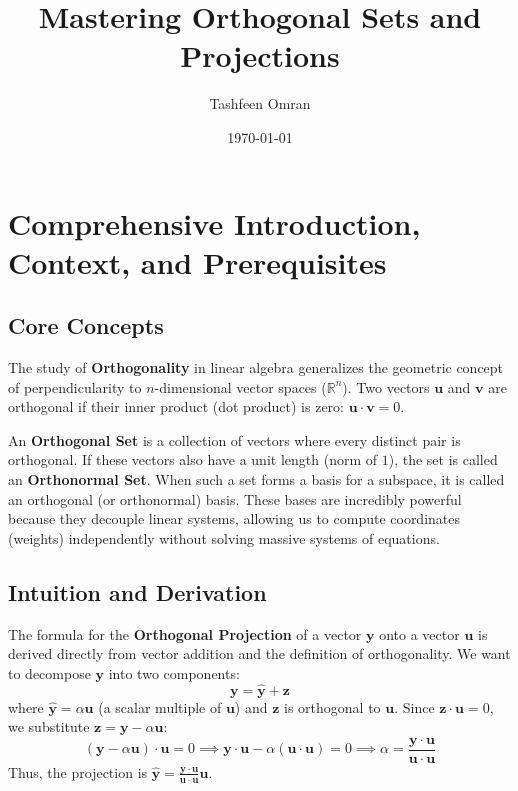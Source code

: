 \documentclass[11pt, letterpaper]{article}
\title{\textbf{Mastering Orthogonal Sets and Projections}}
\author{Tashfeen Omran}
\date{\today}
\theoremstyle{definition}
\theoremstyle{remark}
\newcommand{\R}{\mathbb{R}}
\begin{document}
\maketitle
\tableofcontents
\newpage

\section{Comprehensive Introduction, Context, and Prerequisites}

\subsection{Core Concepts}
The study of \textbf{Orthogonality} in linear algebra generalizes the geometric concept of perpendicularity to $n$-dimensional vector spaces ($\R^n$). Two vectors $\mathbf{u}$ and $\mathbf{v}$ are orthogonal if their inner product (dot product) is zero: $\mathbf{u} \cdot \mathbf{v} = 0$. 

An \textbf{Orthogonal Set} is a collection of vectors where every distinct pair is orthogonal. If these vectors also have a unit length (norm of $1$), the set is called an \textbf{Orthonormal Set}. When such a set forms a basis for a subspace, it is called an orthogonal (or orthonormal) basis. These bases are incredibly powerful because they decouple linear systems, allowing us to compute coordinates (weights) independently without solving massive systems of equations.

\subsection{Intuition and Derivation}
The formula for the \textbf{Orthogonal Projection} of a vector $\mathbf{y}$ onto a vector $\mathbf{u}$ is derived directly from vector addition and the definition of orthogonality. We want to decompose $\mathbf{y}$ into two components:
\[ \mathbf{y} = \hat{\mathbf{y}} + \mathbf{z} \]
where $\hat{\mathbf{y}} = \alpha \mathbf{u}$ (a scalar multiple of $\mathbf{u}$) and $\mathbf{z}$ is orthogonal to $\mathbf{u}$. 
Since $\mathbf{z} \cdot \mathbf{u} = 0$, we substitute $\mathbf{z} = \mathbf{y} - \alpha \mathbf{u}$:
\[ (\mathbf{y} - \alpha \mathbf{u}) \cdot \mathbf{u} = 0 \implies \mathbf{y} \cdot \mathbf{u} - \alpha (\mathbf{u} \cdot \mathbf{u}) = 0 \implies \alpha = \frac{\mathbf{y} \cdot \mathbf{u}}{\mathbf{u} \cdot \mathbf{u}} \]
Thus, the projection is $\hat{\mathbf{y}} = \frac{\mathbf{y} \cdot \mathbf{u}}{\mathbf{u} \cdot \mathbf{u}} \mathbf{u}$.
\end{document}
